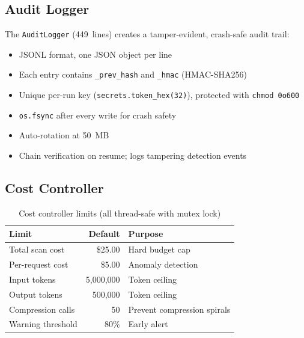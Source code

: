 \documentclass[11pt,a4paper]{article}
\begin{document}
\subsection{Audit Logger}
The \texttt{AuditLogger} (449~lines) creates a tamper-evident, crash-safe audit trail:
\begin{itemize}[noitemsep]
  \item JSONL format, one JSON object per line
  \item Each entry contains \texttt{\_prev\_hash} and \texttt{\_hmac} (HMAC-SHA256)
  \item Unique per-run key (\texttt{secrets.token\_hex(32)}), protected with \texttt{chmod 0o600}
  \item \texttt{os.fsync} after every write for crash safety
  \item Auto-rotation at 50~MB
  \item Chain verification on resume; logs tampering detection events
\end{itemize}

\subsection{Cost Controller}
\begin{table}[H]
\centering
\caption{Cost controller limits (all thread-safe with mutex lock)}
\label{tab:cost}
\begin{tabular}{lrl}
\toprule
\textbf{Limit} & \textbf{Default} & \textbf{Purpose} \\
\midrule
Total scan cost      & \$25.00    & Hard budget cap \\
Per-request cost     & \$5.00     & Anomaly detection \\
Input tokens         & 5{,}000{,}000  & Token ceiling \\
Output tokens        & 500{,}000  & Token ceiling \\
Compression calls    & 50         & Prevent compression spirals \\
Warning threshold    & 80\%       & Early alert \\
\bottomrule
\end{tabular}
\end{table}
\end{document}
